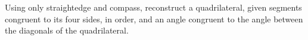 Using only straightedge and compass,
reconstruct a quadrilateral,
given segments congruent to its four sides, in order,
and an angle congruent to the angle between the diagonals of the quadrilateral.
